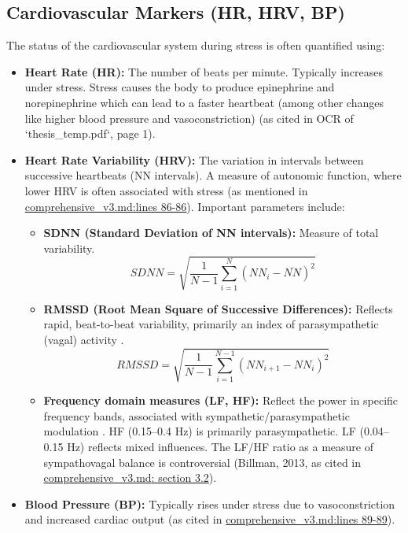 \documentclass[11pt, a4paper]{report}
\newcommand{\mdcite}[3]{\href{run:./sources/#1}{\url{#1}:lines #2-#3}} %
\newcommand{\mdcitesec}[2]{\href{run:./sources/#1}{\url{#1}: section #2}}
\begin{document}
\subsection{Cardiovascular Markers (HR, HRV, BP)}
\label{subsec:cv_markers}
The status of the cardiovascular system during stress is often quantified using:
\begin{itemize}
    \item \textbf{Heart Rate (HR):} The number of beats per minute. Typically increases under stress. Stress causes the body to produce epinephrine and norepinephrine which can lead to a faster heartbeat (among other changes like higher blood pressure and vasoconstriction) \cite{Turner_IndividualDifferences} (as cited in OCR of `thesis_temp.pdf`, page 1).
    \item \textbf{Heart Rate Variability (HRV):} The variation in intervals between successive heartbeats (NN intervals). A measure of autonomic function, where lower HRV is often associated with stress \cite{TaskForce1996} (as mentioned in \mdcite{comprehensive_v3.md}{86}{86}). Important parameters include:
        \begin{itemize}
            \item \textbf{SDNN (Standard Deviation of NN intervals):} Measure of total variability.
            \begin{equation}
                SDNN = \sqrt{\frac{1}{N-1} \sum_{i=1}^{N} (NN_i - \overline{NN})^2}
            \end{equation}
            \item \textbf{RMSSD (Root Mean Square of Successive Differences):} Reflects rapid, beat-to-beat variability, primarily an index of parasympathetic (vagal) activity \cite{TaskForce1996}.
            \begin{equation}
                RMSSD = \sqrt{\frac{1}{N-1} \sum_{i=1}^{N-1} (NN_{i+1} - NN_i)^2}
            \end{equation}
            \item \textbf{Frequency domain measures (LF, HF):} Reflect the power in specific frequency bands, associated with sympathetic/parasympathetic modulation \cite{TaskForce1996}. HF (0.15–0.4 Hz) is primarily parasympathetic. LF (0.04–0.15 Hz) reflects mixed influences. The LF/HF ratio as a measure of sympathovagal balance is controversial (Billman, 2013, as cited in \mdcitesec{comprehensive_v3.md}{3.2}).
        \end{itemize}
    \item \textbf{Blood Pressure (BP):} Typically rises under stress due to vasoconstriction and increased cardiac output \cite{LutgendorfEtAl2000} (as cited in \mdcite{comprehensive_v3.md}{89}{89}).
\end{itemize}
\end{document}
